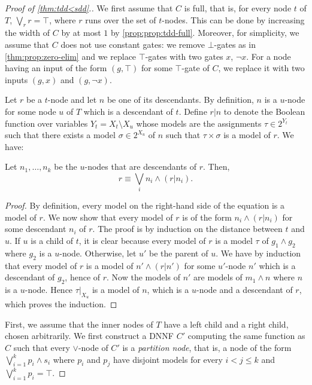 \documentclass[a4paper,UKenglish,cleveref, autoref, thm-restate]{lipics-v2021}
\begin{document}
\begin{toappendix}

\begin{proof}[Proof of \cref{thm:tdd<sdd}.]
  We first assume that $C$ is full, that is, for every node $t$ of $T$, $\bigvee_{r} r = \top$, where $r$ runs over the set of $t$-nodes. This can be done by increasing the width of $C$ by at most $1$ by \cref{prop:prop:tdd-full}. Moreover, for simplicity, we assume that $C$ does not use constant gates: we remove $\bot$-gates as in \cref{thm:prop:zero-elim} and we replace $\top$-gates with two gates $x$, $\neg x$. For a node having an input of the form $(g, \top)$ for some $\top$-gate of $C$, we replace it with two inputs $(g,x)$ and $(g,\neg x)$.

  Let $r$ be a $t$-node and let $n$ be one of its descendants. By definition, $n$ is a $u$-node for some node $u$ of $T$ which is a descendant of $t$. Define $r|n$ to denote the Boolean function over variables $Y_t = X_t \setminus X_u$ whose models are the assignments $\tau \in 2^{Y_t}$ such that there exists a model $\sigma \in 2^{X_u}$ of $n$ such that $\tau \times \sigma$ is a model of $r$. We have:
\begin{lemma} \label{lem:decomp}
Let $n_1, \dots, n_k$ be the $u$-nodes that are descendants of $r$. Then, 
\[ r \equiv \bigvee_i n_i \land (r|n_i) . \]
\end{lemma}
\begin{proof}
  By definition, every model on the right-hand side of the equation is a model of $r$. We now show that every model of $r$ is of the form $n_i \land (r|n_i)$ for some descendant $n_i$ of $r$. The proof is by induction on the distance between $t$ and $u$. If $u$ is a child of $t$, it is clear because every model of $r$ is a model $\tau$ of $g_1 \wedge g_2$ where $g_2$ is a $u$-node. Otherwise, let $u'$ be the parent of $u$. We have by induction that every model of $r$ is a model of $n' \land (r|n')$ for some $u'$-node $n'$ which is a descendant of $g_2$, hence of $r$. Now the models of $n'$ are models of $m_1 \wedge n$ where $n$ is a $u$-node. Hence $\tau|_{X_u}$ is a model of $n$, which is a $u$-node and a descendant of $r$, which proves the induction. 
\end{proof}

First, we assume that the inner nodes of $T$ have a left child and a right child, chosen arbitrarily. We first construct a DNNF $C'$ computing the same function as $C$ such that every $\vee$-node of $C'$ is a \emph{partition node}, that is, a node of the form $\bigvee_{i=1}^k p_i \wedge s_i$ where $p_i$ and $p_j$ have disjoint models for every $i < j \leq k$ and $\bigvee_{i=1}^k p_i = \top$. 


\end{proof}
\end{toappendix}
\end{document}
